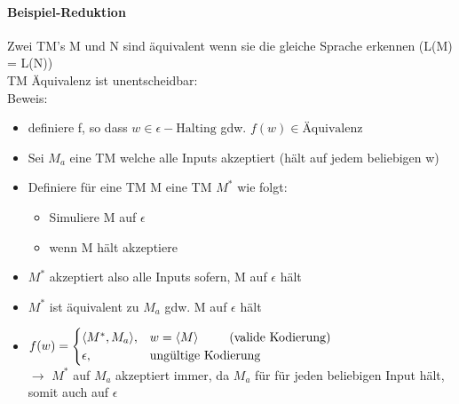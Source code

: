 \documentclass[12pt,a4paper]{article}
\begin{document}
\paragraph{Beispiel-Reduktion}
Zwei TM's M und N sind äquivalent wenn sie die gleiche Sprache erkennen (L(M) = L(N))\\
TM Äquivalenz ist unentscheidbar:\\
Beweis:
\begin{itemize}
\item definiere f, so dass $w\in \epsilon-\text{Halting}$ gdw. $f(w) \in \text{Äquivalenz}$
\item Sei $M_a$ eine TM welche alle Inputs akzeptiert (hält auf jedem beliebigen w)
\item Definiere für eine TM M eine TM $M^*$ wie folgt:
\begin{itemize}
\item Simuliere M auf $\epsilon$
\item wenn M hält akzeptiere
\end{itemize}
\item $M^*$ akzeptiert also alle Inputs sofern, M auf $\epsilon$ hält
\item $M^*$ ist äquivalent zu $M_a$ gdw. M auf $\epsilon$ hält
\item $\displaystyle f(w) = \begin{cases} \langle M^*, M_a \rangle, & w= \langle M \rangle \text{\hspace{25pt}(valide Kodierung)} \\ \epsilon, & \text{ungültige Kodierung} \end{cases}$\\
$\rightarrow$ $M^*$ auf $M_a$ akzeptiert immer, da $M_a$ für für jeden beliebigen Input hält, somit auch auf $\epsilon$
\end{itemize}
\end{document}
